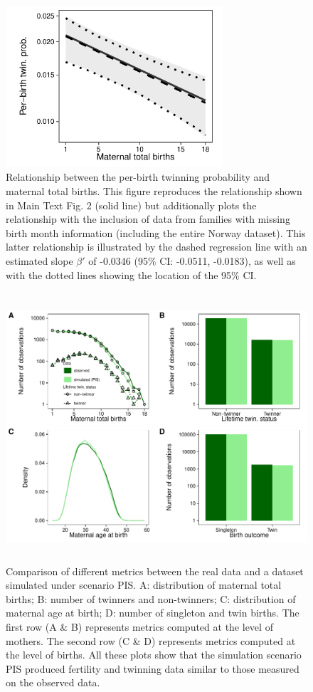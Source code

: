 \documentclass[a4paper]{article}\usepackage[]{graphicx}\usepackage[]{color}
\begin{document}
\begin{figure}[H]
\begin{center}
\includegraphics[height = 6cm]{../figures/figS5.pdf}
\end{center}
\caption{Relationship between the per-birth twinning probability and maternal total births. This figure reproduces the relationship shown in Main Text Fig. 2 (solid line) but additionally plots the relationship with the inclusion of data from families with missing birth month information (including the entire Norway dataset). This latter relationship is illustrated by the dashed regression line with an estimated slope $\beta'$ of -0.0346 (95\% CI: -0.0511, -0.0183), as well as with the dotted lines showing the location of the 95\% CI.}
\end{figure}

\begin{figure}[H]
\begin{center}
\includegraphics[height = 10cm]{../figures/figS6.pdf}
\end{center}
\caption{Comparison of different metrics between the real data and a dataset simulated under scenario PIS. A: distribution of maternal total births; B: number of twinners and non-twinners; C: distribution of maternal age at birth; D: number of singleton and twin births. The first row (A \& B) represents metrics computed at the level of mothers. The second row (C \& D) represents metrics computed at the level of births. All these plots show that the simulation scenario PIS produced fertility and twinning data similar to those measured on the observed data.}
\end{figure}
\end{document}
